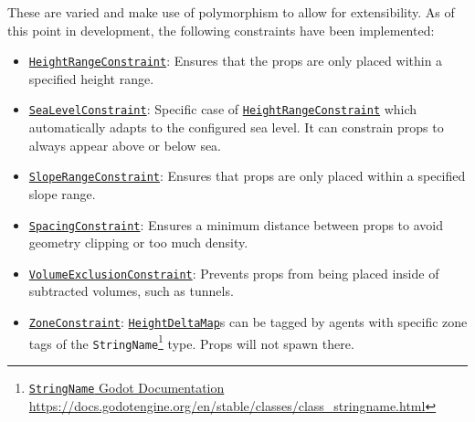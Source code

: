 These are varied and make use of polymorphism to allow for extensibility.
As of this point in development, the following constraints have been implemented: 
\begin{itemize}
    \item \href{https://github.com/fsande/TFG---Eric-Rios/blob/main/Godot-TerrainGeneration/terrain_generation/props/constraints/height_range_constraint.gd}{\texttt{HeightRangeConstraint}}: Ensures that the props are only placed within a specified height range.
    \item \href{https://github.com/fsande/TFG---Eric-Rios/blob/main/Godot-TerrainGeneration/terrain_generation/props/constraints/sea_level_constraint.gd}{\texttt{SeaLevelConstraint}}: Specific case of \href{https://github.com/fsande/TFG---Eric-Rios/blob/main/Godot-TerrainGeneration/terrain_generation/props/constraints/height_range_constraint.gd}{\texttt{HeightRangeConstraint}} which automatically adapts to the configured sea level. 
    It can constrain props to always appear above or below sea.
    \item \href{https://github.com/fsande/TFG---Eric-Rios/blob/main/Godot-TerrainGeneration/terrain_generation/props/constraints/slope_range_constraint.gd}{\texttt{SlopeRangeConstraint}}: Ensures that props are only placed within a specified slope range.
    \item \href{https://github.com/fsande/TFG---Eric-Rios/blob/main/Godot-TerrainGeneration/terrain_generation/props/constraints/spacing_constraint.gd}{\texttt{SpacingConstraint}}: Ensures a minimum distance between props to avoid geometry clipping or too much density.
    \item \href{https://github.com/fsande/TFG---Eric-Rios/blob/main/Godot-TerrainGeneration/terrain_generation/props/constraints/volume_exclusion_constraint.gd}{\texttt{VolumeExclusionConstraint}}: Prevents props from being placed inside of subtracted volumes, such as tunnels.
    \item \href{https://github.com/fsande/TFG---Eric-Rios/blob/main/Godot-TerrainGeneration/terrain_generation/props/constraints/zone_constraint.gd}{\texttt{ZoneConstraint}}: \href{https://github.com/fsande/TFG---Eric-Rios/blob/main/Godot-TerrainGeneration/terrain_generation/core/height_delta_map.gd}{\texttt{HeightDeltaMap}}s can be tagged by agents with specific zone tags of the \texttt{StringName}\footnote{\href{https://docs.godotengine.org/en/stable/classes/class_stringname.html}{\texttt{StringName} Godot Documentation}\\ \hspace*{1.9em}\url{https://docs.godotengine.org/en/stable/classes/class_stringname.html}} type.
    Props will not spawn there.
\end{itemize}

